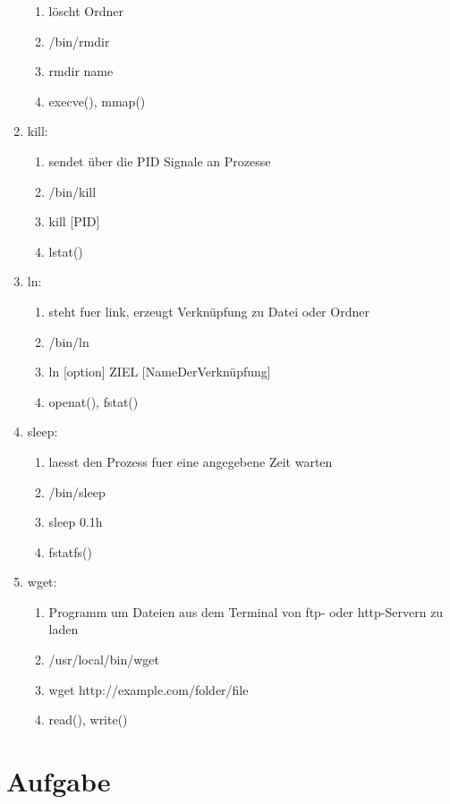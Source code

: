 \documentclass[11pt,a4paper,ngerman]{article}
\begin{document}
\begin{enumerate}
\begin{enumerate}
		\item l\"oscht Ordner
		\item /bin/rmdir
		\item rmdir name
		\item execve(), mmap()
	\end{enumerate}
\item kill:
	\begin{enumerate}
		\item sendet \"uber die PID Signale an Prozesse
		\item /bin/kill
		\item kill [PID]
		\item lstat()
	\end{enumerate}
\pagebreak
\item ln:
	\begin{enumerate}
		\item steht fuer link, erzeugt Verkn\"upfung zu Datei oder Ordner
		\item /bin/ln
		\item ln {[option]} ZIEL {[NameDerVerkn\"upfung]}
		\item openat(), fstat()
	\end{enumerate}
\item sleep:
	\begin{enumerate}
		\item laesst den Prozess fuer eine angegebene Zeit warten
		\item /bin/sleep
		\item sleep 0.1h
		\item fstatfs()
	\end{enumerate}
\item wget:
	\begin{enumerate}
		\item Programm um Dateien aus dem Terminal von ftp- oder http-Servern zu laden
		\item /usr/local/bin/wget
		\item wget http://example.com/folder/file
		\item read(), write()
	\end{enumerate}
\end{enumerate}


\section{Aufgabe}
\end{document}
